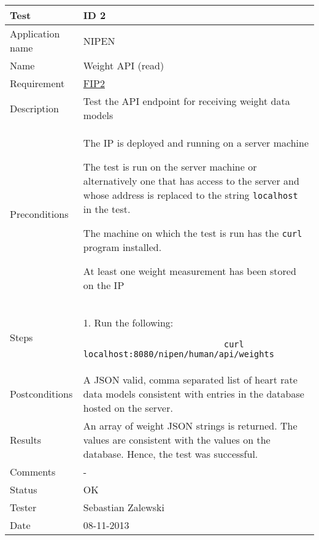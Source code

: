 \begin{table}
\begin{center}
\begin{tabular}{ | l | p{10cm} | }
	\hline
	\textbf{Test}	&	\textbf{ID 2} \\
	\hline\noalign{\smallskip}\noalign{\smallskip}\hline
	Application name	& NIPEN \\
	Name				& Weight API (read) \\
	Requirement			& \hyperref[table:reqip]{FIP2} \\
	Description			& Test the API endpoint for receiving weight data models \\
	Preconditions		&	\par The IP is deployed and running on a server machine
							\par The test is run on the server machine or alternatively
							one that has access to the server and whose address is replaced to the
							string \verb|localhost| in the test.
							\par The machine on which the test is run has the \verb|curl| program installed.
							\par At least one weight measurement has been stored on the IP \\
	Steps 				&	1. Run the following:
							\begin{verbatim}
							curl localhost:8080/nipen/human/api/weights
							\end{verbatim}
							\\
	Postconditions		& A JSON valid, comma separated list of heart rate data models consistent with 
							entries in the database hosted on the server. \\
	Results				& An array of weight JSON strings is returned. 
						  The values are consistent with the values on the database. 
						  Hence, the test was successful. \\
	Comments			& - \\
	Status				& OK \\
	Tester				& Sebastian Zalewski \\
	Date				& 08-11-2013 \\
	\hline
\end{tabular}
\end{center}
\end{table}

